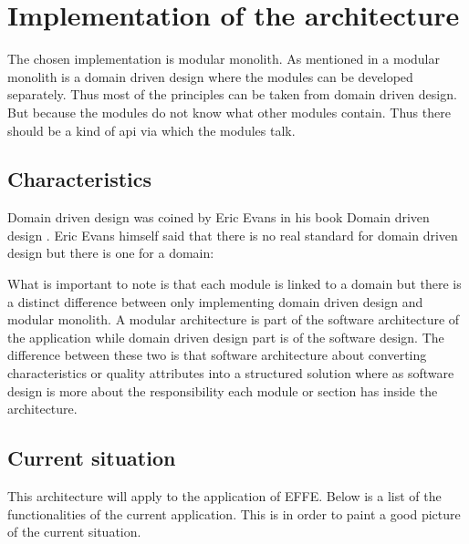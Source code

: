 \chapter{Implementation of the architecture}

The chosen implementation is modular monolith. As mentioned in  a modular monolith is a domain driven design where the modules can be developed separately. Thus most of the principles can be taken from domain driven design. But because the modules do not know what other modules contain. Thus there should be a kind of api via which the modules talk.

\section{Characteristics}

Domain driven design was coined by Eric Evans in his book Domain driven design \cite{domainDrivenDesign}. Eric Evans himself said that there is no real standard for domain driven design but there is one for a domain:


What is important to note is that each module is linked to a domain but there is a distinct difference between only implementing domain driven design and modular monolith. A modular architecture is part of the software architecture of the application while domain driven design part is of the software design. The difference between these two is that software architecture about converting characteristics or quality attributes into a structured solution where as software design is more about the responsibility each module or section has inside the architecture. \cite{softwareArchitectureDefinition}

\section{Current situation}

This architecture will apply to the application of EFFE. Below is a list of the functionalities of the current application. This is in order to paint a good picture of the current situation.

